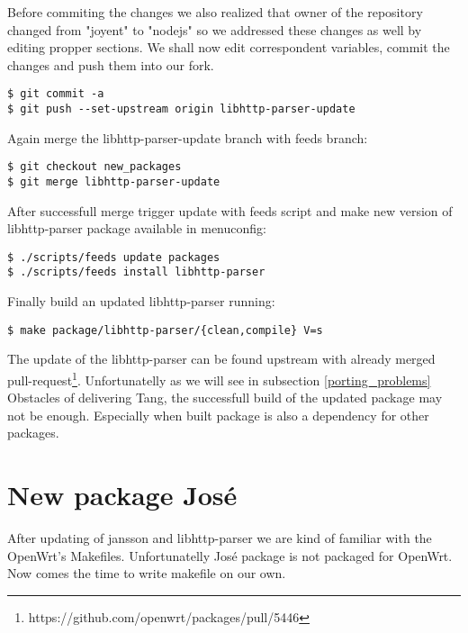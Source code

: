 Before commiting the changes we also realized that owner of the repository changed from "joyent" to "nodejs" so we addressed these changes as well by editing propper sections.
We shall now edit correspondent variables, commit the changes and push them into our fork.
\begin{lstlisting}[columns=fixed,basicstyle=\ttfamily\footnotesize,tabsize=4,backgroundcolor=\color{yellow!10}]
$ git commit -a
$ git push --set-upstream origin libhttp-parser-update
\end{lstlisting}
Again merge the libhttp-parser-update branch with feeds branch:
\begin{lstlisting}[columns=fixed,basicstyle=\ttfamily\footnotesize,tabsize=4,backgroundcolor=\color{yellow!10}]
$ git checkout new_packages
$ git merge libhttp-parser-update
\end{lstlisting}
After successfull merge trigger update with feeds script and make new version of libhttp-parser package available in menuconfig:
\begin{lstlisting}[columns=fixed,basicstyle=\ttfamily\footnotesize,tabsize=4,backgroundcolor=\color{yellow!10}]
$ ./scripts/feeds update packages
$ ./scripts/feeds install libhttp-parser
\end{lstlisting}
Finally build an updated libhttp-parser running:
\begin{lstlisting}[columns=fixed,basicstyle=\ttfamily\footnotesize,tabsize=4,backgroundcolor=\color{yellow!10}]
$ make package/libhttp-parser/{clean,compile} V=s
\end{lstlisting}
The update of the libhttp-parser can be found upstream with already merged pull-request\footnote{https://github.com/openwrt/packages/pull/5446}.
Unfortunatelly as we will see in subsection \ref{porting_problems} Obstacles of delivering Tang, the successfull build of the updated package may not be enough.
Especially when built package is also a dependency for other packages.



\section{New package José}

After updating of jansson and libhttp-parser we are kind of familiar with the OpenWrt's Makefiles.
Unfortunatelly José package is not packaged for OpenWrt.
Now comes the time to write makefile on our own.


